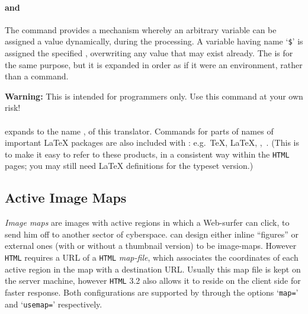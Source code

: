 %
%
\paragraph*{\texttt{}%
\texttt{} and 
\texttt{}%
\texttt{}\label{HTMLset}}
The  command provides a mechanism whereby an arbitrary
\Perl{} variable can be assigned a value dynamically, during the \latextohtml{} processing. 
A variable having name `\texttt{\$}' is assigned the specified ,
overwriting any value that may exist already. The  is for the same purpose,
but it is expanded in order as if it were an environment, rather than a command.

\medskip\noindent
\textbf{Warning: }This is intended for \Perl{} programmers only.
Use this command at your own risk!

\htmlrule[width=300]
%
%
%
\paragraph*{\label{l2hname}} 
expands to the name \latextohtml, of this translator.
Commands for parts of names of important \LaTeX{} packages are also 
included with \latextohtml: e.g.\ \TeX, \LaTeX, \AmS, \Xy\,.
(This is to make it easy to refer to these products, in a consistent way
within the \texttt{HTML} pages; you may still need \LaTeX{} definitions
for the typeset version.)

\medskip



\subsection{Active Image Maps\label{ImageMaps}}%
%
%
%
%
\emph{Image maps} are images with active regions in which a 
Web-surfer can click, to send him off to another sector of cyberspace.  
\latextohtml{} can design either inline ``figures'' or external ones 
(with or without a thumbnail version) to be image-maps.  
However \texttt{HTML} requires a URL of a \texttt{HTML} \emph{map-file}, 
which associates the coordinates of each active region in
the map with a destination URL.  
Usually this map file is kept on the server machine, 
however \texttt{HTML} 3.2 also allows it 
to reside on the client side for faster response.  
Both configurations are supported by \latextohtml{} 
through the  options
`\texttt{map=}' and `\texttt{usemap=}' respectively.

